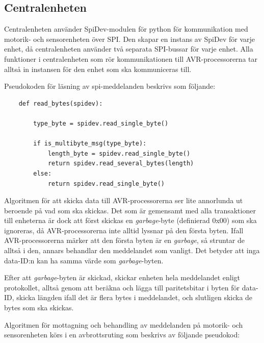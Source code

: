 \documentclass[a4paper,titlepage,12pt]{article}
\begin{document}
    \subsection{Centralenheten}

    Centralenheten använder SpiDev-modulen för python för kommunikation med
    motorik- och sensorenheten över SPI. Den skapar en instans av SpiDev för
    varje enhet, då centralenheten använder två separata SPI-bussar för varje
    enhet. Alla funktioner i centralenheten som rör kommunikationen till AVR-processorerna tar
    alltså in instansen för den enhet som ska kommuniceras till.

    Pseudokoden för läsning av spi-meddelanden beskrivs som följande:

	\begin{lstlisting}
	def read_bytes(spidev):

		type_byte = spidev.read_single_byte()

        if is_multibyte_msg(type_byte):
            length_byte = spidev.read_single_byte()
            return spidev.read_several_bytes(length)
        else:
            return spidev.read_single_byte()

	\end{lstlisting}

	Algoritmen för att skicka data till AVR-processorerna ser lite annorlunda
    ut beroende på vad som ska skickas. Det som är gemensamt med alla
    transaktioner till enheterna är dock att först skickas en \textit{garbage}-byte
    (definierad 0x00) som ska ignoreras,
    då AVR-processorerna inte alltid lyssnar på den första 
    byten. Ifall AVR-processorerna märker att den första byten är en
    \textit{garbage}, så struntar de alltså i den, annars behandlar den
    meddelandet som vanligt. Det betyder att inga data-ID:n kan ha samma
    värde som \textit{garbage}-byten.

    Efter att \textit{garbage}-byten är skickad, skickar enheten hela
    meddelandet enligt protokollet, alltså genom att beräkna och lägga till
    paritetsbitar i byten för data-ID, skicka längden ifall det är flera bytes
    i meddelandet, och slutligen skicka de bytes som ska skickas.

	Algoritmen för mottagning och behandling av meddelanden på motorik- och
    sensorenheten körs i en avbrottsruting som beskrivs av följande pseudokod:
\end{document}

